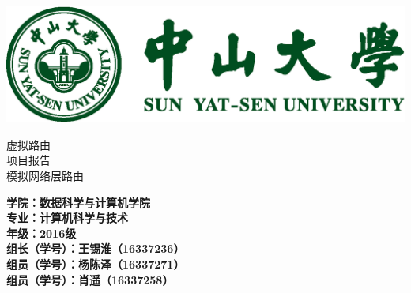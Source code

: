 \begin{titlepage}
    \centering
    \includegraphics[scale=0.9]{imgs/SYSULogo.png}\par\vspace{1cm}
    \vspace{1cm}
    {\scshape\huge 虚拟路由 \\ 项目报告 \\ \centering \scshape \Huge 模拟网络层路由 \par}
    \vspace{1.5cm}
    {\Large\bfseries \flushleft 学院：数据科学与计算机学院 \\ 专业：计算机科学与技术 \\ 年级：2016级 \\组长（学号）：王锡淮（16337236）\\组员（学号）：杨陈泽（16337271）\\
    组员（学号）：肖遥（16337258）\par}

\end{titlepage}